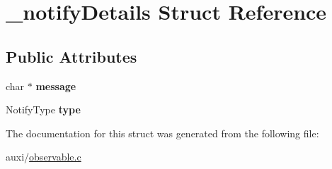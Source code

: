 \hypertarget{struct__notifyDetails}{}\section{\+\_\+notify\+Details Struct Reference}
\label{struct__notifyDetails}
\subsection*{Public Attributes}
\begin{DoxyCompactItemize}
\item 
\mbox{\label{struct__notifyDetails_afac2c447e392e7c1e3909b273964fd80}} 
char $\ast$ {\bfseries message}
\item 
\mbox{\label{struct__notifyDetails_a61cbb27fd89268790477ebca856fcb7e}} 
Notify\+Type {\bfseries type}
\end{DoxyCompactItemize}


The documentation for this struct was generated from the following file\+:\begin{DoxyCompactItemize}
\item 
auxi/\hyperlink{observable_8c}{observable.\+c}\end{DoxyCompactItemize}
